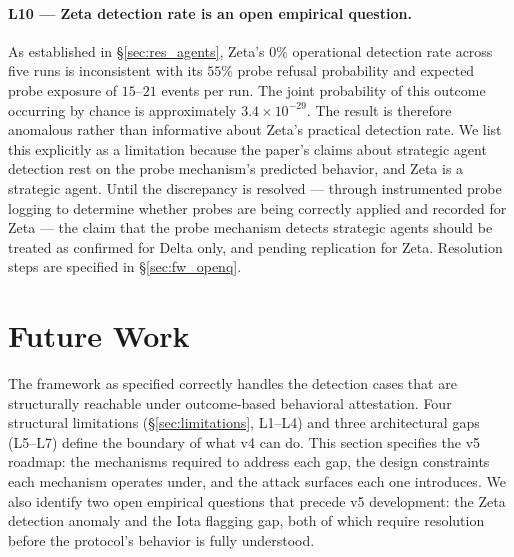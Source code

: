 \paragraph{L10 — Zeta detection rate is an open empirical question.}
As established in \S\ref{sec:res_agents}, Zeta's $0\%$ operational detection rate across
five runs is inconsistent with its $55\%$ probe refusal probability and expected probe
exposure of $15$--$21$ events per run.  The joint probability of this outcome occurring
by chance is approximately $3.4 \times 10^{-29}$.  The result is therefore anomalous
rather than informative about Zeta's practical detection rate.  We list this explicitly
as a limitation because the paper's claims about strategic agent detection rest on the
probe mechanism's predicted behavior, and Zeta is a strategic agent.  Until the
discrepancy is resolved — through instrumented probe logging to determine whether probes
are being correctly applied and recorded for Zeta — the claim that the probe mechanism
detects strategic agents should be treated as confirmed for Delta only, and pending
replication for Zeta.  Resolution steps are specified in \S\ref{sec:fw_openq}.
%

\section{Future Work}
\label{sec:futurework}

The framework as specified correctly handles the detection cases that are structurally
reachable under outcome-based behavioral attestation.  Four structural limitations
(\S\ref{sec:limitations}, L1--L4) and three architectural gaps (L5--L7) define the
boundary of what v4 can do.  This section specifies the v5 roadmap: the mechanisms
required to address each gap, the design constraints each mechanism operates under,
and the attack surfaces each one introduces.  We also identify two open empirical
questions that precede v5 development: the Zeta detection anomaly and the Iota
flagging gap, both of which require resolution before the protocol's behavior is
fully understood.

